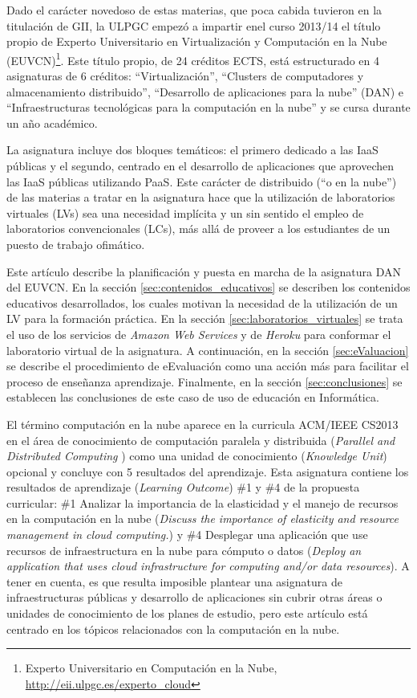 \documentclass[conference]{IEEEtran}
\begin{document}
Dado
el carácter novedoso de estas materias, que poca cabida tuvieron en la
titulación de GII, la ULPGC empezó a impartir enel curso 2013/14 el título propio de Experto Universitario en
Virtualización y Computación en la Nube (EUVCN)\footnote{Experto Universitario en Computación en la Nube,
\url{http://eii.ulpgc.es/experto\_cloud}}. Este título
propio, de 24
créditos ECTS,
está estructurado  en 4 asignaturas de 6 créditos:
``Virtualización'',
``Clusters de computadores y almacenamiento distribuido'', ``Desarrollo de
aplicaciones para la nube'' (DAN) e ``Infraestructuras tecnológicas para la
computación en la nube'' y se cursa durante un año académico.

La asignatura  incluye dos
bloques temáticos: el primero dedicado a las IaaS públicas y el segundo,
centrado en el desarrollo de aplicaciones que aprovechen las IaaS públicas
utilizando PaaS. Este carácter de distribuido (``o en la nube'') de las
materias a tratar en la asignatura hace que la utilización de
laboratorios virtuales (LVs) \cite{Zhang:2010} sea una necesidad implícita y un
sin sentido el
empleo de
laboratorios convencionales (LCs), más allá de proveer a los estudiantes de un puesto de trabajo
ofimático.





Este artículo describe la planificación y puesta en marcha de la asignatura
DAN del EUVCN. En  la sección \ref{sec:contenidos_educativos} se describen los
contenidos educativos desarrollados, los cuales motivan la necesidad de la
utilización de un LV para la formación práctica. En la sección
\ref{sec:laboratorios_virtuales} se trata el uso de los servicios de
\textit{Amazon Web Services} \cite{AWS:2011} y de \textit{Heroku}
\cite{Heroku:2013} para conformar el laboratorio
virtual de la asignatura. A continuación, en la sección \ref{sec:eValuacion}
se describe el procedimiento de eEvaluación \cite{Moral2013} como una acción más para facilitar el proceso de enseñanza aprendizaje. Finalmente, en la sección
\ref{sec:conclusiones} se establecen las conclusiones de este caso de uso de
educación en Informática.

El término computación en la nube aparece en la curricula ACM/IEEE CS2013 en el área de conocimiento de computación paralela y distribuida (\textit{Parallel and Distributed Computing} )
como una unidad de conocimiento (\textit{Knowledge Unit}) opcional y concluye con 5 resultados del aprendizaje.
Esta asignatura contiene los resultados de aprendizaje (\textit{Learning Outcome}) \#1 y \#4 de la propuesta curricular: \#1 Analizar la importancia de la elasticidad y el manejo de recursos en la computación en la nube
(\textit{Discuss the importance of elasticity and resource management in cloud computing.}) y
\#4 Desplegar una aplicación que use recursos de infraestructura en la nube para cómputo o datos
(\textit{Deploy an application that uses cloud infrastructure for computing and/or data resources}).
A tener en cuenta, es que resulta imposible plantear una asignatura de infraestructuras públicas y desarrollo de aplicaciones sin cubrir
otras áreas o unidades de conocimiento de los planes de estudio, pero este artículo está centrado en los tópicos relacionados con la computación en la nube.
\end{document}
